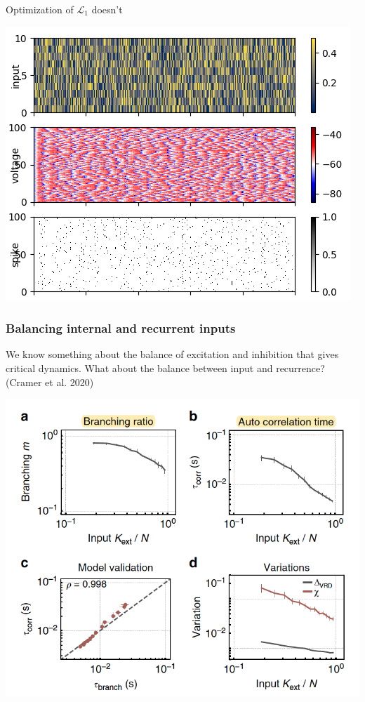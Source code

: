 \documentclass{beamer}
\begin{document}
\begin{frame}[plain]
\frametitle{} 

Optimization of $\mathcal{L}_{1}$ doesn't

\begin{center}
\includegraphics[scale=0.65]{global-traces}
\end{center}

\end{frame}


\begin{frame}[plain]
\frametitle{Balancing internal and recurrent inputs} 

We know something about the balance of excitation and inhibition that gives critical dynamics. What about the balance between input and recurrence? (Cramer et al. 2020)


\begin{center}
\includegraphics[scale=0.55]{cramer-criticality}
\end{center}

\end{frame}
\end{document}
